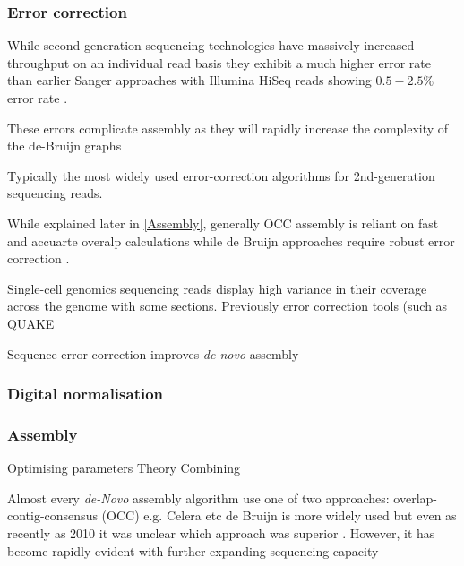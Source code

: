 







\subsubsection{Error correction}

While second-generation sequencing technologies have massively increased
throughput on an individual read basis they exhibit a much higher error
rate than earlier Sanger approaches with Illumina HiSeq reads showing \(0.5-2.5\%\)
error rate \citep{Kelley2010}.  

These errors complicate assembly as they will rapidly increase
the complexity of the de-Bruijn graphs 

Typically the most widely used error-correction algorithms for 2nd-generation
sequencing reads. 


While explained later in \ref{Assembly}, generally OCC assembly is reliant on 
fast and accuarte overalp calculations while de Bruijn approaches require
robust error correction \citep{Palmer2010}.



Single-cell genomics sequencing reads display high variance in their coverage 
across the genome with some sections. Previously error correction tools (such as
QUAKE \citep{Kelley2010}

\citep{Nikolenko2013}

Sequence error correction improves \textit{de novo} assembly \citep{MacManes2013}









\subsubsection{Digital normalisation}

\subsubsection{Assembly}
Optimising parameters
Theory
Combining


Almost every \textit{de-Novo} assembly algorithm use one of two approaches:
overlap-contig-consensus (OCC) e.g. Celera etc
de Bruijn is more widely used but even as recently as 2010 it was unclear
which approach was superior \citep{Palmer2010}.
However, it has become rapidly evident with further expanding sequencing capacity





